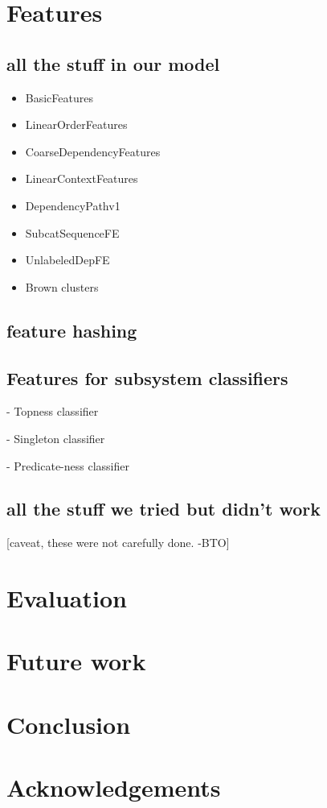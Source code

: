 \documentclass[11pt]{article}
\newcommand{\bocomment}[1]{\textcolor{Bittersweet}{[#1 -BTO]}}
\begin{document}
\section{Features}

\subsection{all the stuff in our model}

\label{s:features}

\begin{itemize}
\item BasicFeatures
\item LinearOrderFeatures
\item CoarseDependencyFeatures
\item LinearContextFeatures
\item DependencyPathv1
\item SubcatSequenceFE
\item UnlabeledDepFE
\item Brown clusters
\end{itemize}
\subsection{feature hashing}


\subsection{Features for subsystem classifiers}

 - Topness classifier

 - Singleton classifier

 - Predicate-ness classifier


\subsection{all the stuff we tried but didn't work}

\bocomment{caveat, these were not carefully done.}


\section{Evaluation}
\label{s:datasplits}

\section{Future work}

\section{Conclusion}

\nocite{flanigan-etal:ACL2014}



\section*{Acknowledgements}



\end{document}
